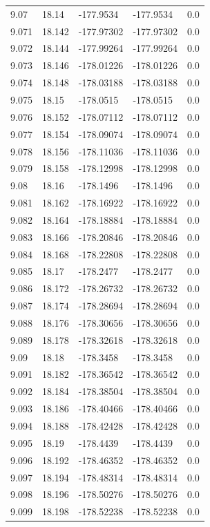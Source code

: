 \begin{tabular}{lllll}
9.07 & 18.14 & -177.9534 & -177.9534 & 0.0 \\
9.071 & 18.142 & -177.97302 & -177.97302 & 0.0 \\
9.072 & 18.144 & -177.99264 & -177.99264 & 0.0 \\
9.073 & 18.146 & -178.01226 & -178.01226 & 0.0 \\
9.074 & 18.148 & -178.03188 & -178.03188 & 0.0 \\
9.075 & 18.15 & -178.0515 & -178.0515 & 0.0 \\
9.076 & 18.152 & -178.07112 & -178.07112 & 0.0 \\
9.077 & 18.154 & -178.09074 & -178.09074 & 0.0 \\
9.078 & 18.156 & -178.11036 & -178.11036 & 0.0 \\
9.079 & 18.158 & -178.12998 & -178.12998 & 0.0 \\
9.08 & 18.16 & -178.1496 & -178.1496 & 0.0 \\
9.081 & 18.162 & -178.16922 & -178.16922 & 0.0 \\
9.082 & 18.164 & -178.18884 & -178.18884 & 0.0 \\
9.083 & 18.166 & -178.20846 & -178.20846 & 0.0 \\
9.084 & 18.168 & -178.22808 & -178.22808 & 0.0 \\
9.085 & 18.17 & -178.2477 & -178.2477 & 0.0 \\
9.086 & 18.172 & -178.26732 & -178.26732 & 0.0 \\
9.087 & 18.174 & -178.28694 & -178.28694 & 0.0 \\
9.088 & 18.176 & -178.30656 & -178.30656 & 0.0 \\
9.089 & 18.178 & -178.32618 & -178.32618 & 0.0 \\
9.09 & 18.18 & -178.3458 & -178.3458 & 0.0 \\
9.091 & 18.182 & -178.36542 & -178.36542 & 0.0 \\
9.092 & 18.184 & -178.38504 & -178.38504 & 0.0 \\
9.093 & 18.186 & -178.40466 & -178.40466 & 0.0 \\
9.094 & 18.188 & -178.42428 & -178.42428 & 0.0 \\
9.095 & 18.19 & -178.4439 & -178.4439 & 0.0 \\
9.096 & 18.192 & -178.46352 & -178.46352 & 0.0 \\
9.097 & 18.194 & -178.48314 & -178.48314 & 0.0 \\
9.098 & 18.196 & -178.50276 & -178.50276 & 0.0 \\
9.099 & 18.198 & -178.52238 & -178.52238 & 0.0 \\

\end{tabular}
